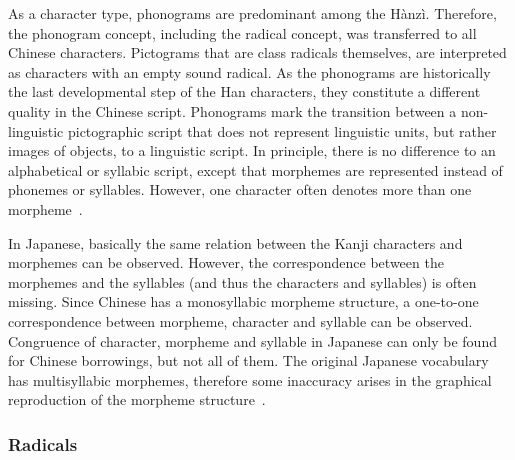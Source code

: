 As a character type, phonograms are predominant among the Hànzì. Therefore, the
phonogram concept, including the radical concept, was transferred to all Chinese 
characters. Pictograms that are class radicals themselves, are interpreted as 
characters with an empty sound radical. As the phonograms are historically the 
last developmental step of the Han characters, they constitute a different 
quality in the Chinese script. Phonograms mark the transition between a 
non-linguistic pictographic script that does not represent linguistic units, 
but rather images of objects, to a linguistic script. In principle, there is no 
difference to an alphabetical or syllabic script, except that morphemes are 
represented instead of phonemes or syllables. However, one character often 
denotes more than one morpheme~.

In Japanese, basically the same relation between the Kanji characters and 
morphemes can be observed. However, the correspondence between the morphemes and 
the syllables (and thus the characters and syllables) is often missing.
Since Chinese has a monosyllabic morpheme structure, a one-to-one correspondence
between morpheme, character and syllable can be observed.
Congruence of character, morpheme and syllable in Japanese can only be found for
Chinese borrowings, but not all of them. The original Japanese vocabulary has
multisyllabic morphemes, therefore some inaccuracy arises in the graphical
reproduction of the morpheme structure~.



\subsubsection{Radicals}
\label{sec:radicals}


